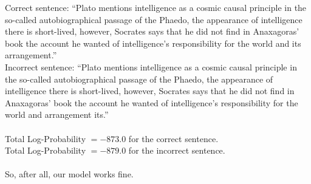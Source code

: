 \documentclass[12pt]{article}
\begin{document}
Correct sentence: \enquote{Plato mentions intelligence as a cosmic causal principle in the so-called
autobiographical passage of the Phaedo, the appearance of intelligence there is short-lived,
however, Socrates says that he did not find in Anaxagoras’ book the account he wanted of
intelligence’s responsibility for the world and its arrangement.} \\
Incorrect sentence: \enquote{Plato mentions intelligence as a cosmic causal principle in the so-called
autobiographical passage of the Phaedo, the appearance of intelligence there is short-lived,
however, Socrates says that he did not find in Anaxagoras’ book the account he wanted of
intelligence’s responsibility for the world and arrangement its.} \\
\\
Total Log-Probability $= -873.0$ for the correct sentence. \\
Total Log-Probability $=-879.0$ for the incorrect sentence.
\\
\\
So, after all, our model works fine.	
\end{document}
